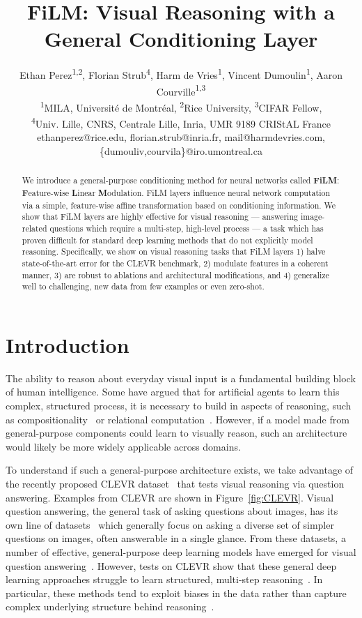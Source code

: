 \documentclass[letterpaper]{article} \usepackage{aaai18}  \usepackage{times}  \usepackage{helvet}  \usepackage{courier}  \usepackage{url}  \usepackage{graphicx}  \frenchspacing  \setlength{\pdfpagewidth}{8.5in}  \setlength{\pdfpageheight}{11in}
\title{FiLM: Visual Reasoning with a General Conditioning Layer}
\author{Ethan Perez\textnormal{\textsuperscript{1,2}},
Florian Strub\textnormal{\textsuperscript{4}},
Harm de Vries\textnormal{\textsuperscript{1}},
Vincent Dumoulin\textnormal{\textsuperscript{1}},
Aaron Courville\textnormal{\textsuperscript{1,3}}\\
\textsuperscript{1}MILA, Universit\'e de Montr\'eal,
\textsuperscript{2}Rice University,
\textsuperscript{3}CIFAR Fellow,\\
\textsuperscript{4}Univ. Lille, CNRS, Centrale Lille, Inria, UMR 9189 CRIStAL France\\
ethanperez@rice.edu, florian.strub@inria.fr, mail@harmdevries.com,\{dumouliv,courvila\}@iro.umontreal.ca
}
\begin{document}
\maketitle
\begin{abstract}
    	We introduce a general-purpose conditioning method for neural networks called \textbf{FiLM}: \textbf{F}eature-w\textbf{i}se \textbf{L}inear \textbf{M}odulation. FiLM layers influence neural network computation via a simple, feature-wise affine transformation based on conditioning information. We show that FiLM layers are highly effective for visual reasoning --- answering image-related questions which require a multi-step, high-level process --- a task which has proven difficult for standard deep learning methods that do not explicitly model reasoning. Specifically, we show on visual reasoning tasks that FiLM layers 1) halve state-of-the-art error for the CLEVR benchmark, 2) modulate features in a coherent manner, 3) are robust to ablations and architectural modifications, and 4) generalize well to challenging, new data from few examples or even zero-shot.
\end{abstract}

\section{Introduction} \label{introduction}
    The ability to reason about everyday visual input is a fundamental building block of human intelligence. Some have argued that for artificial agents to learn this complex, structured process, it is necessary to build in aspects of reasoning, such as compositionality~\cite{N2NMN,IEP} or relational computation~\cite{RN}. However, if a model made from general-purpose components could learn to visually reason, such an architecture would likely be more widely applicable across domains.

    To understand if such a general-purpose architecture exists, we take advantage of the recently proposed CLEVR dataset~\cite{CLEVR} that tests visual reasoning via question answering. Examples from CLEVR are shown in Figure~\ref{fig:CLEVR}. Visual question answering, the general task of asking questions about images, has its own line of datasets~\cite{malinowski2014multi,geman2015visual,antol2015} which generally focus on asking a diverse set of simpler questions on images, often answerable in a single glance. From these datasets, a number of effective, general-purpose deep learning models have emerged for visual question answering~\cite{malinowski2015ask,SANs,lu2016hierarchical,anderson2017bottom}. However, tests on CLEVR show that these general deep learning approaches struggle to learn structured, multi-step reasoning~\cite{CLEVR}. In particular, these methods tend to exploit biases in the data rather than capture complex underlying structure behind reasoning~\cite{goyal2016making}.
\end{document}
